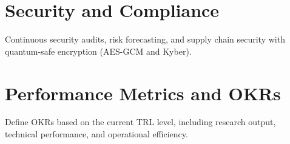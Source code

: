 \documentclass{article}
\begin{document}
\section{Security and Compliance}
Continuous security audits, risk forecasting, and supply chain security with quantum-safe encryption (AES-GCM and Kyber).

\section{Performance Metrics and OKRs}
Define OKRs based on the current TRL level, including research output, technical performance, and operational efficiency.
\end{document}
